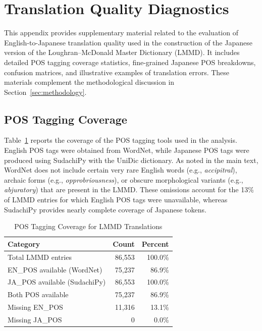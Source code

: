 \section{Translation Quality Diagnostics}
\label{appendix:translation_diagnostics}

This appendix provides supplementary material related to the evaluation of English-to-Japanese translation quality used in the construction of the Japanese version of the Loughran--McDonald Master Dictionary (LMMD). 
It includes detailed POS tagging coverage statistics, fine-grained Japanese POS breakdowns, confusion matrices, and illustrative examples of translation errors. 
These materials complement the methodological discussion in Section~\ref{sec:methodology}.

\subsection{POS Tagging Coverage}
\label{appendix:pos_coverage}

Table~\ref{tab:pos_coverage_appendix} reports the coverage of the POS tagging tools used in the analysis.
English POS tags were obtained from WordNet, while Japanese POS tags were produced using SudachiPy with the UniDic dictionary.
As noted in the main text, WordNet does not include certain very rare English words (e.g., \textit{accipitral}), archaic forms (e.g., \textit{opprobriousness}), or obscure morphological variants (e.g., \textit{abjuratory}) that are present in the LMMD.
These omissions account for the 13\% of LMMD entries for which English POS tags were unavailable, whereas SudachiPy provides nearly complete coverage of Japanese tokens.

\begin{table}[h]
\centering
\caption{POS Tagging Coverage for LMMD Translations}
\label{tab:pos_coverage_appendix}
\begin{tabular}{lrr}
\toprule
\textbf{Category} & \textbf{Count} & \textbf{Percent} \\
\midrule
Total LMMD entries               & 86,553  & 100.0\% \\
EN\_POS available (WordNet)      & 75,237  & 86.9\%  \\
JA\_POS available (SudachiPy)    & 86,553  & 100.0\% \\
Both POS available               & 75,237  & 86.9\%  \\
Missing EN\_POS                  & 11,316  & 13.1\%  \\
Missing JA\_POS                  & 0       & 0.0\%   \\
\bottomrule
\end{tabular}
\end{table}

